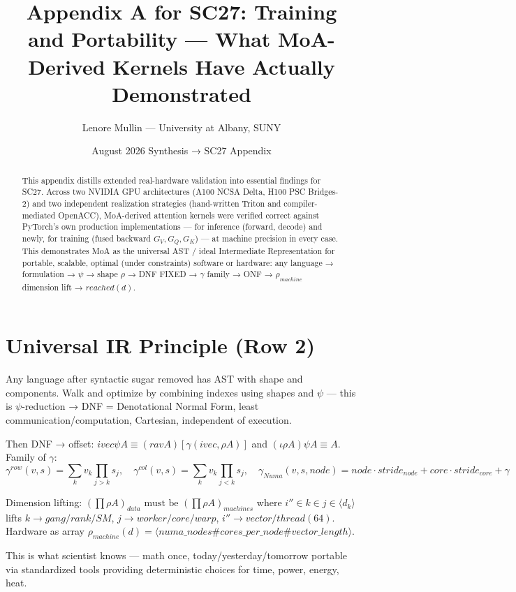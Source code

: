 \documentclass[11pt]{article}
\title{Appendix A for SC27: Training and Portability — What MoA-Derived Kernels Have Actually Demonstrated}
\author{Lenore Mullin — University at Albany, SUNY}
\date{August 2026 Synthesis → SC27 Appendix}
\begin{document}
\maketitle

\begin{abstract}
This appendix distills extended real-hardware validation into essential findings for SC27. Across two NVIDIA GPU architectures (A100 NCSA Delta, H100 PSC Bridges-2) and two independent realization strategies (hand-written Triton and compiler-mediated OpenACC), MoA-derived attention kernels were verified correct against PyTorch's own production implementations — for inference (forward, decode) and newly, for training (fused backward $G_V,G_Q,G_K$) — at machine precision in every case. This demonstrates MoA as the universal AST / ideal Intermediate Representation for portable, scalable, optimal (under constraints) software or hardware: any language → formulation → $\psi$ → shape $\rho$ → DNF FIXED → $\gamma$ family → ONF → $\rho_{machine}$ dimension lift → $reached(d)$.
\end{abstract}

\section{Universal IR Principle (Row 2)}
Any language after syntactic sugar removed has AST with shape and components. Walk and optimize by combining indexes using shapes and $\psi$ — this is $\psi$-reduction → DNF = Denotational Normal Form, least communication/computation, Cartesian, independent of execution.

Then DNF → offset: $ivec \psi A \equiv (rav A)[\gamma(ivec,\rho A)]$ and $(\iota \rho A)\psi A \equiv A$. Family of $\gamma$:
$$\gamma^{row}(v,s)=\sum_k v_k\prod_{j>k}s_j,\quad \gamma^{col}(v,s)=\sum_k v_k\prod_{j<k}s_j,\quad \gamma_{Numa}(v,s,node)=node\cdot stride_{node}+core\cdot stride_{core}+\gamma$$

Dimension lifting: $(\prod \rho A)_{data} \text{ must be } (\prod \rho A)_{machines}$ where $i''\in k\in j\in\langle d_k\rangle$ lifts $k\to gang/rank/SM$, $j\to worker/core/warp$, $i''\to vector/thread(64)$. Hardware as array $\rho_{machine}(d)=\langle numa\_nodes\# cores\_per\_node\# vector\_length\rangle$.

This is what scientist knows — math once, today/yesterday/tomorrow portable via standardized tools providing deterministic choices for time, power, energy, heat.
\end{document}
